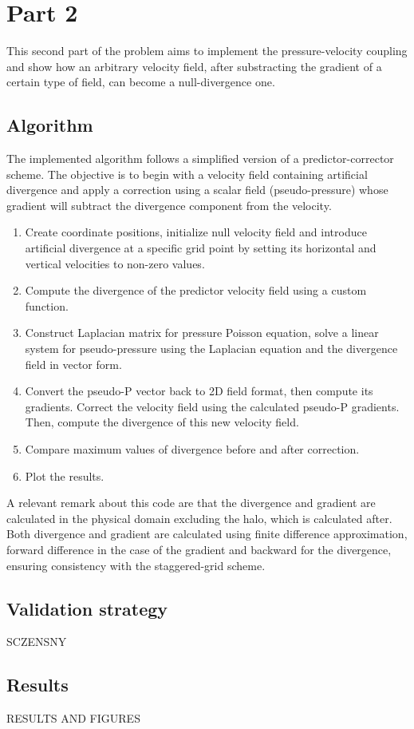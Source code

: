 \section{Part 2}

This second part of the problem aims to implement the pressure-velocity coupling and show how an arbitrary velocity field, after substracting the gradient of a certain type of field, can become a null-divergence one.

\subsection{Algorithm}

The implemented algorithm follows a simplified version of a predictor-corrector scheme. The objective is to begin with a velocity field containing artificial divergence and apply a correction using a scalar field (pseudo-pressure) whose gradient will subtract the divergence component from the velocity.

\begin{enumerate}
    \item Create coordinate positions, initialize null velocity field and introduce artificial divergence at a specific grid point by setting its horizontal and vertical velocities to non-zero values.
    \item Compute the divergence of the predictor velocity field using a custom function.
    \item Construct Laplacian matrix for pressure Poisson equation, solve a linear system for pseudo-pressure using the Laplacian equation and the divergence field in vector form.
    \item Convert the pseudo-P vector back to 2D field format, then compute its gradients. Correct the velocity field using the calculated pseudo-P gradients. Then, compute the divergence of this new velocity field.
    \item Compare maximum values of divergence before and after correction.
    \item Plot the results.
\end{enumerate}

A relevant remark about this code are that the divergence and gradient are calculated in the physical domain excluding the halo, which is calculated after. Both divergence and gradient are calculated using finite difference approximation, forward difference in the case of the gradient and backward for the divergence, ensuring consistency with the staggered-grid scheme.

\subsection{Validation strategy}

SCZENSNY

\subsection{Results}

RESULTS AND FIGURES